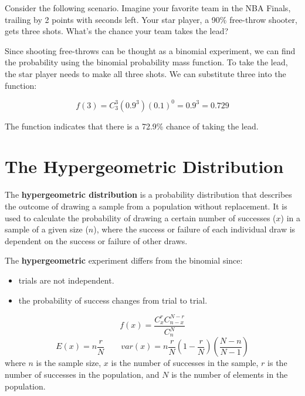 \documentclass[
  11pt,
  letterpaper,
  DIV=11,
  numbers=noendperiod,
  oneside,
  open=any]{scrreprt}
\begin{document}
\begin{bsexample}[Example]

Consider the following scenario. Imagine your favorite team in the NBA
Finals, trailing by 2 points with seconds left. Your star player, a 90\%
free-throw shooter, gets three shots. What's the chance your team takes
the lead?

Since shooting free-throws can be thought as a binomial experiment, we
can find the probability using the binomial probability mass function.
To take the lead, the star player needs to make all three shots. We can
substitute three into the function:

\[f(3)=C_3^3 (0.9^3)(0.1)^{0}=0.9^3=0.729\]

The function indicates that there is a 72.9\% chance of taking the lead.

\end{bsexample}

\section{The Hypergeometric
Distribution}\label{the-hypergeometric-distribution}

The \textbf{hypergeometric distribution} is a probability distribution
that describes the outcome of drawing a sample from a population without
replacement. It is used to calculate the probability of drawing a
certain number of successes (\(x\)) in a sample of a given size (\(n\)),
where the success or failure of each individual draw is dependent on the
success or failure of other draws.

The \textbf{hypergeometric} experiment differs from the binomial since:

\begin{itemize}
\item
  trials are not independent.
\item
  the probability of success changes from trial to trial.
\end{itemize}

\begin{bsformula}

\[f(x)=\frac {C_x^r C_{n-x}^{N-r}}{C_n^N}\]
\[E(x)=n \frac {r}{N} \qquad var(x)= n \frac {r}{N} \left(1- \frac {r}{N}\right) \left(\frac {N-n}{N-1}\right)\]
where \(n\) is the sample size, \(x\) is the number of successes in the
sample, \(r\) is the number of successes in the population, and \(N\) is
the number of elements in the population.

\end{bsformula}
\end{document}
